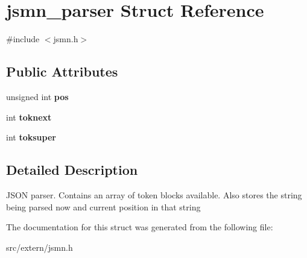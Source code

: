 \hypertarget{structjsmn__parser}{\section{jsmn\+\_\+parser Struct Reference}
\label{structjsmn__parser}
}


{\ttfamily \#include $<$jsmn.\+h$>$}

\subsection*{Public Attributes}
\begin{DoxyCompactItemize}
\item 
\hypertarget{structjsmn__parser_a3d0d6e48d3d5b24262f9e0c2241dc456}{unsigned int {\bfseries pos}}\label{structjsmn__parser_a3d0d6e48d3d5b24262f9e0c2241dc456}

\item 
\hypertarget{structjsmn__parser_a08fc7969f7f21b969e21e2aa8449eb67}{int {\bfseries toknext}}\label{structjsmn__parser_a08fc7969f7f21b969e21e2aa8449eb67}

\item 
\hypertarget{structjsmn__parser_af11fcec48d9f1298909777a12f1d1e39}{int {\bfseries toksuper}}\label{structjsmn__parser_af11fcec48d9f1298909777a12f1d1e39}

\end{DoxyCompactItemize}


\subsection{Detailed Description}
J\+S\+O\+N parser. Contains an array of token blocks available. Also stores the string being parsed now and current position in that string 

The documentation for this struct was generated from the following file\+:\begin{DoxyCompactItemize}
\item 
src/extern/jsmn.\+h\end{DoxyCompactItemize}

